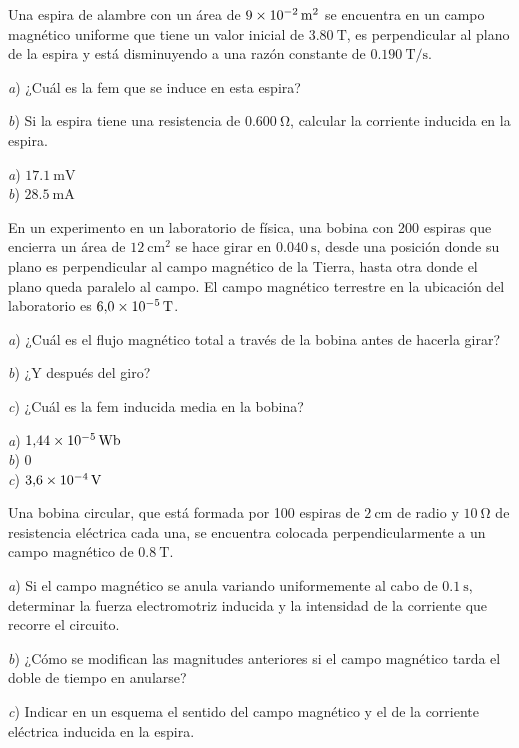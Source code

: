 \setcounter{figure}{0}
%
\begin{Exercise}
    Una espira de alambre con un área de $\SI{9E-2}{\metre\squared}$ se encuentra en un campo magnético uniforme que tiene un valor inicial de $\SI{3.80}{\tesla}$, es perpendicular al plano de la espira y está disminuyendo a una razón constante de $\SI{0.190}{\tesla/\second}$.\par
    \textit{a}) ¿Cuál es la fem que se induce en esta espira?\par
    \textit{b}) Si la espira tiene una resistencia de $\SI{0.600}{\ohm}$, calcular la corriente inducida en la espira.
\end{Exercise}
\begin{Answer}
    \begin{minipage}[t]{.4\textwidth}
        \textit{a}) $\SI{17.1}{\milli\volt}$\\ \textit{b}) $\SI{28.5}{\milli\ampere}$
    \end{minipage}
\end{Answer}
%
\begin{Exercise}
    En un experimento en un laboratorio de física, una bobina con 200 espiras que encierra un área de $\SI{12}{\centi\metre\squared}$ se hace girar en $\SI{0.040}{\second}$, desde una posición donde su plano es perpendicular al campo magnético de la Tierra, hasta otra donde el plano queda paralelo al campo. El campo magnético terrestre en la ubicación del laboratorio es $\SI{6.0E-5}{\tesla}$.\par
    \textit{a}) ¿Cuál es el flujo magnético total a través de la bobina antes de hacerla girar?\par
    \textit{b}) ¿Y después del giro?\par
    \textit{c}) ¿Cuál es la fem inducida media en la bobina?
\end{Exercise}
\begin{Answer}
    \begin{minipage}[t]{.4\textwidth}
        \textit{a}) $\SI{1.44E-5}{\weber}$\\ \textit{b}) $0$\\ \textit{c}) $\SI{3.6E-4}{\volt}$
    \end{minipage}
\end{Answer}
%
\begin{Exercise}
    Una bobina circular, que está formada por 100 espiras de $\SI{2}{\centi\metre}$  de radio y $\SI{10}{\ohm}$ de resistencia eléctrica cada una, se encuentra colocada perpendicularmente a un campo magnético de $\SI{0.8}{\tesla}$.\par
    \textit{a}) Si el campo magnético se anula variando uniformemente al cabo de $\SI{0.1}{\second}$, determinar la fuerza electromotriz inducida y la intensidad de la corriente que recorre el circuito.\par
    \textit{b}) ¿Cómo se modifican las  magnitudes anteriores si el campo magnético tarda el doble de tiempo en anularse?\par
    \textit{c}) Indicar en un esquema el sentido del campo magnético y el de la corriente eléctrica inducida en la espira.
\end{Exercise}
